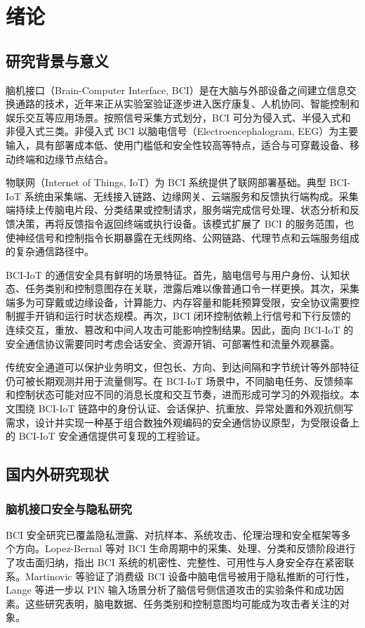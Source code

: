 \chapter{绪论}

\section{研究背景与意义}
脑机接口（Brain-Computer Interface, BCI）是在大脑与外部设备之间建立信息交换通路的技术，近年来正从实验室验证逐步进入医疗康复、人机协同、智能控制和娱乐交互等应用场景\cite{li2025bciindustry,meng2025adversarialbci}。按照信号采集方式划分，BCI 可分为侵入式、半侵入式和非侵入式三类。非侵入式 BCI 以脑电信号（Electroencephalogram, EEG）为主要输入，具有部署成本低、使用门槛低和安全性较高等特点，适合与可穿戴设备、移动终端和边缘节点结合。

物联网（Internet of Things, IoT）为 BCI 系统提供了联网部署基础。典型 BCI-IoT 系统由采集端、无线接入链路、边缘网关、云端服务和反馈执行端构成。采集端持续上传脑电片段、分类结果或控制请求，服务端完成信号处理、状态分析和反馈决策，再将反馈指令返回终端或执行设备。该模式扩展了 BCI 的服务范围，也使神经信号和控制指令长期暴露在无线网络、公网链路、代理节点和云端服务组成的复杂通信路径中。

BCI-IoT 的通信安全具有鲜明的场景特征。首先，脑电信号与用户身份、认知状态、任务类别和控制意图存在关联，泄露后难以像普通口令一样更换。其次，采集端多为可穿戴或边缘设备，计算能力、内存容量和能耗预算受限，安全协议需要控制握手开销和运行时状态规模。再次，BCI 闭环控制依赖上行信号和下行反馈的连续交互，重放、篡改和中间人攻击可能影响控制结果\cite{meng2025adversarialbci,liu2022accesscontrol,trabelsi2023iotaccess}。因此，面向 BCI-IoT 的安全通信协议需要同时考虑会话安全、资源开销、可部署性和流量外观暴露。

传统安全通道可以保护业务明文，但包长、方向、到达间隔和字节统计等外部特征仍可被长期观测并用于流量侧写\cite{velan2015survey,alwhbi2024encrypted,hou2024encmalware,fu2025encryptedtraffic}。在 BCI-IoT 场景中，不同脑电任务、反馈频率和控制状态可能对应不同的消息长度和交互节奏，进而形成可学习的外观指纹。本文围绕 BCI-IoT 链路中的身份认证、会话保护、抗重放、异常处置和外观抗侧写需求，设计并实现一种基于组合数独外观编码的安全通信协议原型，为受限设备上的 BCI-IoT 安全通信提供可复现的工程验证。

\section{国内外研究现状}
\subsection{脑机接口安全与隐私研究}
BCI 安全研究已覆盖隐私泄露、对抗样本、系统攻击、伦理治理和安全框架等多个方向。Lopez-Bernal 等对 BCI 生命周期中的采集、处理、分类和反馈阶段进行了攻击面归纳，指出 BCI 系统的机密性、完整性、可用性与人身安全存在紧密联系\cite{lopezbernal2021bcisecurity}。Martinovic 等验证了消费级 BCI 设备中脑电信号被用于隐私推断的可行性\cite{martinovic2012sidechannel}，Lange 等进一步以 PIN 输入场景分析了脑信号侧信道攻击的实验条件和成功因素\cite{lange2018pinbci}。这些研究表明，脑电数据、任务类别和控制意图均可能成为攻击者关注的对象。

